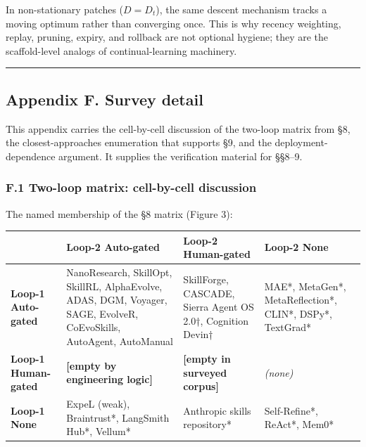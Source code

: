 \documentclass[
]{article}
\newcounter{none} %
\begin{document}
In non-stationary patches (\(D = D_t\)), the same descent mechanism
tracks a moving optimum rather than converging once. This is why recency
weighting, replay, pruning, expiry, and rollback are not optional
hygiene; they are the scaffold-level analogs of continual-learning
machinery.

\begin{center}\rule{0.5\linewidth}{0.5pt}\end{center}

\subsection{Appendix F. Survey detail}\label{appendix-f.-survey-detail}

This appendix carries the cell-by-cell discussion of the two-loop matrix
from §8, the closest-approaches enumeration that supports §9, and the
deployment-dependence argument. It supplies the verification material
for §§8--9.

\subsubsection{F.1 Two-loop matrix: cell-by-cell
discussion}\label{f.1-two-loop-matrix-cell-by-cell-discussion}

The named membership of the §8 matrix (Figure 3):

{\def\LTcaptype{none} %
\begin{longtable}[]{@{}
  >{\raggedright\arraybackslash}p{}
  >{\raggedright\arraybackslash}p{}
  >{\raggedright\arraybackslash}p{}
  >{\raggedright\arraybackslash}p{}@{}}
\toprule\noalign{}
\begin{minipage}[b]{\linewidth}\raggedright
\end{minipage} & \begin{minipage}[b]{\linewidth}\raggedright
\textbf{Loop-2 Auto-gated}
\end{minipage} & \begin{minipage}[b]{\linewidth}\raggedright
\textbf{Loop-2 Human-gated}
\end{minipage} & \begin{minipage}[b]{\linewidth}\raggedright
\textbf{Loop-2 None}
\end{minipage} \\
\midrule\noalign{}
\endhead
\bottomrule\noalign{}
\endlastfoot
\textbf{Loop-1 Auto-gated} & NanoResearch, SkillOpt, SkillRL,
AlphaEvolve, ADAS, DGM, Voyager, SAGE, EvolveR, CoEvoSkills, AutoAgent,
AutoManual & SkillForge, CASCADE, Sierra Agent OS 2.0†, Cognition Devin†
& MAE*, MetaGen*, MetaReflection*, CLIN*, DSPy*, TextGrad* \\
\textbf{Loop-1 Human-gated} & \textbf{{[}empty by engineering logic{]}}
& \textbf{{[}empty in surveyed corpus{]}} & \emph{(none)} \\
\textbf{Loop-1 None} & ExpeL (weak), Braintrust*, LangSmith Hub*,
Vellum* & Anthropic skills repository* & Self-Refine*, ReAct*, Mem0* \\
\end{longtable}
}
\end{document}
